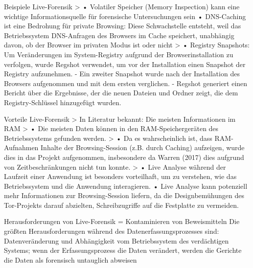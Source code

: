 Beispiele Live-Forensik 
	> \cite{Satvat.2014}
		•	Volatiler Speicher (Memory Inspection) kann eine wichtige Informationsquelle für forensische Untersuchungen sein
		• DNS-Caching ist eine Bedrohung für private Browsing: Diese Schwachstelle entsteht, weil das Betriebssystem DNS-Anfragen des Browsers im Cache speichert, unabhängig davon, ob der Browser im privaten Modus ist oder nicht
	> \cite{Mahlous.2020}
		• Registry Snapshots: Um Veränderungen im System-Registry aufgrund der Browserinstallation zu verfolgen, wurde Regshot verwendet, um vor der Installation einen Snapshot der Registry aufzunehmen.
			- Ein zweiter Snapshot wurde nach der Installation des Browsers aufgenommen und mit dem ersten verglichen.
			- Regshot generiert einen Bericht über die Ergebnisse, der die neuen Dateien und Ordner zeigt, die dem Registry-Schlüssel hinzugefügt wurden.
			
		
		

Vorteile Live-Forensik
	> In Literatur bekannt: Die meisten 
	Informationen im RAM 
		> \cite{Horsman.2019}
			•	Die meisten Daten können in den RAM-Speichergeräten des Betriebssystems gefunden werden.
		> \cite{Muir.2019}
			•	Da es wahrscheinlich ist, dass RAM-Aufnahmen Inhalte der Browsing-Session (z.B. durch Caching) aufzeigen, wurde dies in das Projekt aufgenommen, insbesondere da Warren (2017) dies aufgrund von Zeitbeschränkungen nicht tun konnte.
	> \cite{Muir.2019}
		•	Live Analyse während der Laufzeit einer Anwendung ist besonders vorteilhaft, um zu verstehen, wie das Betriebssystem und die Anwendung interagieren.
		•	Live Analyse kann potenziell mehr Informationen zur Browsing-Session liefern, da die Designbemühungen des Tor-Projekts darauf abzielten, Schreibzugriffe auf die Festplatte zu vermeiden.
		

Herausforderungen von Live-Forensik = Kontaminieren von Beweismitteln \cite{Gupta.2013}
	Die größten Herausforderungen während des Datenerfassungsprozesses sind: Datenveränderung und Abhängigkeit vom Betriebssystem des verdächtigen Systems; wenn der Erfassungsprozess die Daten verändert, werden die Gerichte die Daten als forensisch untauglich abweisen


